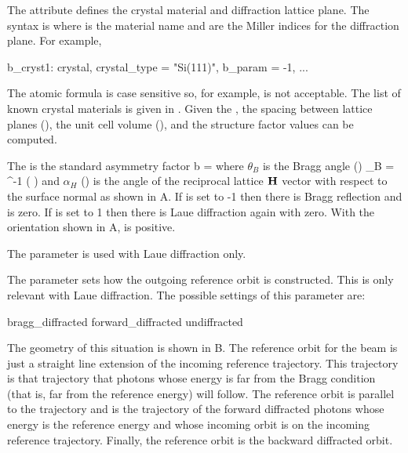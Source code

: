 The  attribute defines the crystal material and
diffraction lattice plane. The syntax is  where 
is the material name and  are the Miller
indices for the diffraction plane. For example,
\begin{example}
  b_cryst1: crystal, crystal_type = "Si(111)", b_param = -1, ...
\end{example}
The atomic formula is case sensitive so, for example, 
is not acceptable. The list of known crystal materials is given in
. Given the , the spacing between
lattice planes (), the unit cell volume
(), and the structure factor\cite{b:batterman} values
can be computed.

The  is the standard asymmetry factor
\Begineq
  b =  
  \label{batat}
\Endeq
where $\theta_B$ is the Bragg angle () 
\Begineq
  \theta_B = \sin^{-1} \left(  \right)
\Endeq
and $\alpha_H$ () is the angle of the reciprocal
lattice ${\bf H}$ vector with respect to the surface normal as shown in
A.  If  is set to -1 then there is
Bragg reflection and  is zero. If  is set to 1
then there is Laue diffraction again with  zero. With the
orientation shown in A,  is positive.

The  parameter is used with Laue diffraction only.

The  parameter sets how the outgoing reference
orbit is constructed. This is only relevant with Laue diffraction.
The possible settings of this parameter are:
\begin{example}
  bragg_diffracted
  forward_diffracted
  undiffracted
\end{example}
The geometry of this situation is shown in B. The
reference orbit for the  beam is just a straight line
extension of the incoming reference trajectory. This trajectory is
that trajectory that photons whose energy is far from the Bragg
condition (that is, far from the reference energy) will follow. The
 reference orbit is parallel to the
 trajectory and is the trajectory of the forward
diffracted photons whose energy is the reference energy and whose
incoming orbit is on the incoming reference trajectory. Finally, the
 reference orbit is the backward diffracted orbit.

